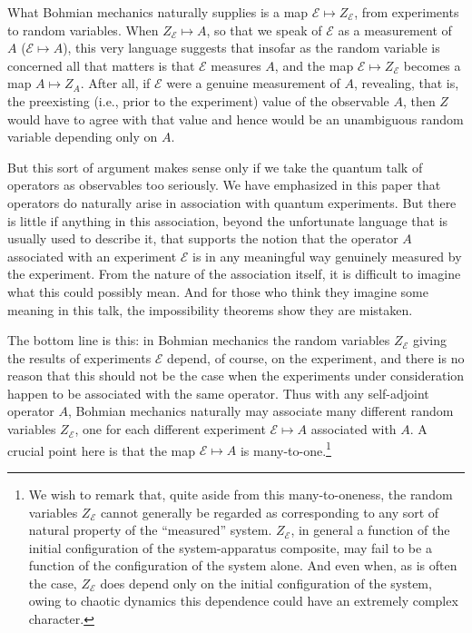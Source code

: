 \documentclass[12pt]{article}
\newcommand{\sa}{self-adjoint}
\newcommand{\BM}{Bohmian mechanics}
\newcommand{\E}{\mbox{$\mathscr{E}$}}
\begin{document}
What \BM{} naturally supplies is a map $\E\mapsto{}Z_{\E}$, {}from
experiments to random variables. When $Z_{\E}\mapsto{}A$, so that we
speak of \E{} as a measurement of $A$ ($\E\mapsto{}A$), this very
language suggests that insofar as the random variable is concerned all
that matters is that \E{} measures $A$, and the map
$\E\mapsto{}Z_{\E}$ becomes a map $A\mapsto{}Z_A$.  After all, if \E{}
were a genuine measurement of $A$, revealing, that is, the preexisting
(i.e., prior to the experiment) value of the observable $A$, then $Z$
would have to agree with that value and hence would be an unambiguous
random variable depending only on $A$.

But this sort of argument makes sense only if we take the quantum talk
of operators as observables too seriously.  We have emphasized in this
paper that operators do naturally arise in association with quantum
experiments. But there is little if anything in this association,
beyond the unfortunate language that is usually used to describe it,
that supports the notion that the operator $A$ associated with an
experiment \E{} is in any meaningful way genuinely measured by the
experiment.  From the nature of the association itself, it is
difficult to imagine what this could possibly mean.  And for those who
think they imagine some meaning in this talk, the impossibility
theorems show they are mistaken.

The bottom line is this: in \BM{} the random variables $Z_{\E}$ giving
the results of experiments \E{} depend, of course, on the experiment,
and there is no reason that this should not be the case when the
experiments under consideration happen to be associated with the same
operator. Thus with any \sa{} operator $A$, \BM{} naturally may
associate many different random variables $Z_{\E}$, one for each
different experiment $\E\mapsto{}A$ associated with $A$. A crucial
point here is that the map $\E\mapsto{}A$ is many-to-one.\footnote{We
   wish to remark that, quite aside {}from this many-to-oneness, the
   random variables $Z_{\E}$ cannot generally be regarded as
   corresponding to any sort of natural property of the ``measured''
   system. $Z_{\E}$, in general a function of the initial configuration
   of the system-apparatus composite, may fail to be a function of the
   configuration of the system alone. And even when, as is often the
   case, $Z_{\E}$ does depend only on the initial configuration of the
   system, owing to chaotic dynamics this dependence could have an
   extremely complex character.}  \bigskip
\end{document}
